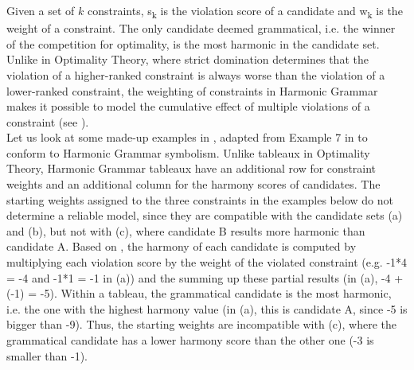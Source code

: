 Given a set of $k$ constraints, s\textsubscript{k} is the violation score of a candidate and w\textsubscript{k} is the weight of a constraint. The only candidate deemed grammatical, i.e. the winner of the competition for optimality, is the most harmonic in the candidate set. Unlike in Optimality Theory, where strict domination determines that the violation of a higher-ranked constraint is always worse than the violation of a lower-ranked constraint, the weighting of constraints in Harmonic Grammar makes it possible to model the cumulative effect of multiple violations of a constraint (see ). \\
Let us look at some made-up examples in , adapted from Example 7 in \textcite{kuhn2002corpus} to conform to Harmonic Grammar symbolism. Unlike tableaux in Optimality Theory, Harmonic Grammar tableaux have an additional row for constraint weights and an additional column for the harmony scores of candidates. The starting weights assigned to the three constraints in the examples below do not determine a reliable model, since they are compatible with the candidate sets (a) and (b), but not with (c), where candidate B results more harmonic than candidate A.  Based on , the harmony of each candidate is computed by multiplying each violation score by the weight of the violated constraint (e.g. -1*4 = -4 and -1*1 = -1 in (a)) and the summing up these partial results (in (a), -4 + (-1) = -5). Within a tableau, the grammatical candidate is the most harmonic, i.e. the one with the highest harmony value (in (a), this is candidate A, since -5 is bigger than -9). Thus, the starting weights are incompatible with (c), where the grammatical candidate has a lower harmony score than the other one (-3 is smaller than -1).


